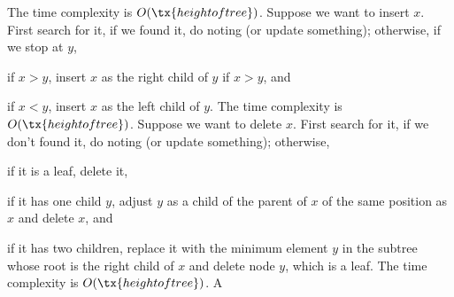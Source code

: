 \documentclass[a4paper,12pt]{article}
\begin{document}
The time complexity is $O(\tx{height of tree})$.
Suppose we want to insert $x$. First search for it, if we found it, do noting (or update something); otherwise, if we stop at $y$,
\bit
\item if $x>y$, insert $x$ as the right child of $y$ if $x>y$, and
\item if $x<y$, insert $x$ as the left child of $y$.
\eit
The time complexity is $O(\tx{height of tree})$.
Suppose we want to delete $x$. First search for it, if we don't found it, do noting (or update something); otherwise,
\bit
\item if it is a leaf, delete it,
\item if it has one child $y$, adjust $y$ as a child of the parent of $x$ of the same position as $x$ and delete $x$, and
\item if it has two children, replace it with the minimum element $y$ in the subtree whose root is the right child of $x$ and delete node $y$, which is a leaf.
\eit
The time complexity is $O(\tx{height of tree})$.
A
\end{document}
